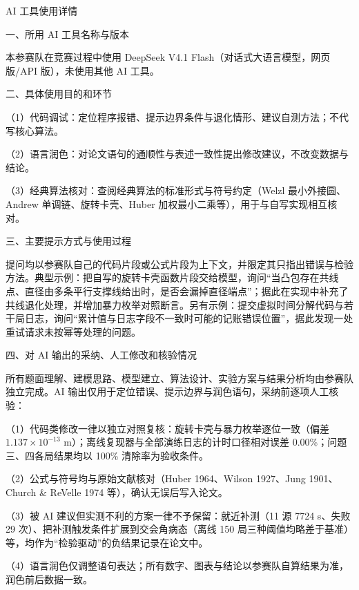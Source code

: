 \documentclass[12pt,a4paper]{ctexart}
\begin{document}
\pagestyle{empty}
\begin{center}
	{\heiti{} AI 工具使用详情}
\end{center}
\vspace{6pt}
{\heiti{} 一、所用 AI 工具名称与版本}
\par
本参赛队在竞赛过程中使用 DeepSeek V4.1 Flash（对话式大语言模型，网页版/API 版），未使用其他 AI 工具。
\par
{\heiti{} 二、具体使用目的和环节}
\par
（1）代码调试：定位程序报错、提示边界条件与退化情形、建议自测方法；不代写核心算法。
\par
（2）语言润色：对论文语句的通顺性与表述一致性提出修改建议，不改变数据与结论。
\par
（3）经典算法核对：查阅经典算法的标准形式与符号约定（Welzl 最小外接圆、Andrew 单调链、旋转卡壳、Huber 加权最小二乘等），用于与自写实现相互核对。
\par
{\heiti{} 三、主要提示方式与使用过程}
\par
提问均以参赛队自己的代码片段或公式片段为上下文，并限定其只指出错误与检验方法。典型示例：把自写的旋转卡壳函数片段交给模型，询问“当凸包存在共线点、直径由多条平行支撑线给出时，是否会漏掉直径端点”；据此在实现中补充了共线退化处理，并增加暴力枚举对照断言。另有示例：提交虚拟时间分解代码与若干局日志，询问“累计值与日志字段不一致时可能的记账错误位置”，据此发现一处重试请求未按幂等处理的问题。
\par
{\heiti{} 四、对 AI 输出的采纳、人工修改和核验情况}
\par
所有题面理解、建模思路、模型建立、算法设计、实验方案与结果分析均由参赛队独立完成。AI 输出仅用于定位错误、提示边界与润色语句，采纳前逐项人工核验：
\par
（1）代码类修改一律以独立对照复核：旋转卡壳与暴力枚举逐位一致（偏差 $1.137\times10^{-13}$ m）；离线复现器与全部演练日志的计时口径相对误差 0.00\%；问题三、四各局结果均以 100\% 清除率为验收条件。
\par
（2）公式与符号均与原始文献核对（Huber 1964、Wilson 1927、Jung 1901、Church \& ReVelle 1974 等），确认无误后写入论文。
\par
（3）被 AI 建议但实测不利的方案一律不予保留：就近补测（11 源 7724 s、失败 29 次）、把补测触发条件扩展到交会角病态（离线 150 局三种阈值均略差于基准）等，均作为“检验驱动”的负结果记录在论文中。
\par
（4）语言润色仅调整语句表达；所有数字、图表与结论以参赛队自算结果为准，润色前后数据一致。
\end{document}
